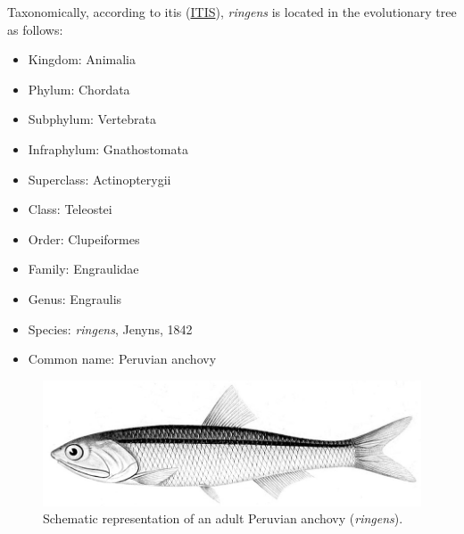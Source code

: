 Taxonomically, according to \acrlong{itis} (\href{https://www.itis.gov/}{ITIS}), \textit{\gls{ringens}} is located in the evolutionary tree as follows:\\

\begin{itemize}
  \centering
  \item Kingdom: Animalia
  \item Phylum: Chordata
  \item Subphylum: Vertebrata
  \item Infraphylum: Gnathostomata
  \item Superclass: Actinopterygii
  \item Class: Teleostei
  \item Order: Clupeiformes
  \item Family: Engraulidae
  \item Genus: Engraulis
  \item Species: \textit{\gls{ringens}}, Jenyns, 1842
  \item Common name: Peruvian anchovy
\end{itemize}

\begin{figure}[!]
	\includegraphics[width=1.0\textwidth]{figures/Chap1Engraulis_ringens.jpg}
	\centering
	\caption{Schematic representation of an adult Peruvian anchovy (\textit{\gls{ringens}}).}
	\label{Chap1Engraulis_ringens}
\end{figure}

